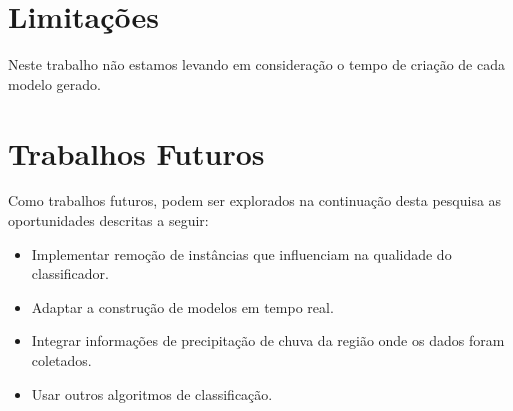 \documentclass[
	12pt,				%
	openright,			%
	oneside,	
	a4paper,				%
	english,				%
	brazil				%
]{abntex2/abntex2} %
\begin{document}
	\newpage
	\newpage
	\section{Limitações}
	
	Neste trabalho não estamos levando em consideração o tempo de criação de cada modelo gerado.
	
	\section{Trabalhos Futuros}
	
	Como trabalhos futuros, podem ser explorados na continuação desta pesquisa as oportunidades descritas a seguir:
	
	\begin{itemize}
		\item Implementar remoção de instâncias que influenciam na qualidade do classificador.
		\item Adaptar a construção de modelos em tempo real.
		\item Integrar informações de precipitação de chuva da região onde os dados foram coletados.
		\item Usar outros algoritmos de classificação.
	\end{itemize}

\postextual
{}
%






\end{document}
